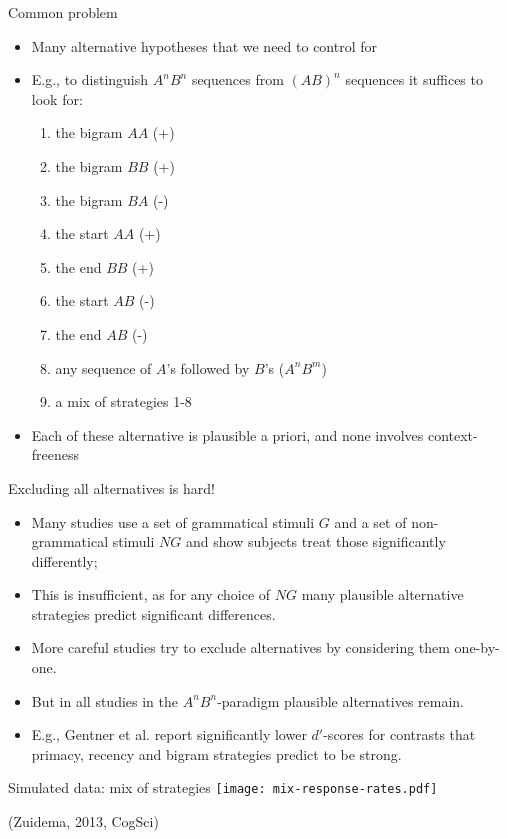 \documentclass[xcolor=table]{beamer}
\begin{document}
\begin{frame}{Common problem}
  \begin{itemize}[<+->]
  \item Many alternative hypotheses that we need to control for
  \item E.g., to distinguish $A^nB^n$ sequences from $(AB)^n$
    sequences it suffices to look for:
    \begin{enumerate}[<+->]
    \item the bigram $AA$ (+)
    \item the bigram $BB$ (+)
    \item the bigram $BA$ (-)
    \item the start $AA$ (+)
    \item the end $BB$ (+)
    \item the start $AB$ (-)
    \item the end $AB$ (-)
    \item any sequence of $A$'s followed by $B$'s ($A^nB^m$)
    \item a mix of strategies 1-8
    \end{enumerate}
  \item Each of these alternative is plausible a priori, and none
    involves context-freeness
  \end{itemize}
\end{frame}

\begin{frame}{Excluding all alternatives is hard!}
  \begin{itemize}[<+->]
  \item Many studies use a set of grammatical stimuli $G$ and a set of
    non-grammatical stimuli $NG$ and show subjects treat those
    significantly differently;
  \item This is insufficient, as for any choice of $NG$ many plausible alternative strategies predict significant differences.
  \item More careful studies try to exclude alternatives by considering them one-by-one.
  \item But in all studies in the $A^nB^n$-paradigm plausible alternatives remain.
  \item E.g., Gentner et al. report significantly lower $d'$-scores for contrasts that primacy, recency and bigram strategies predict to be strong.
  \end{itemize}
\end{frame}

\begin{frame}{Simulated data: mix of strategies}
  \texttt{[image: mix-response-rates.pdf]}

\small (Zuidema, 2013, CogSci)
\end{frame}
\end{document}
